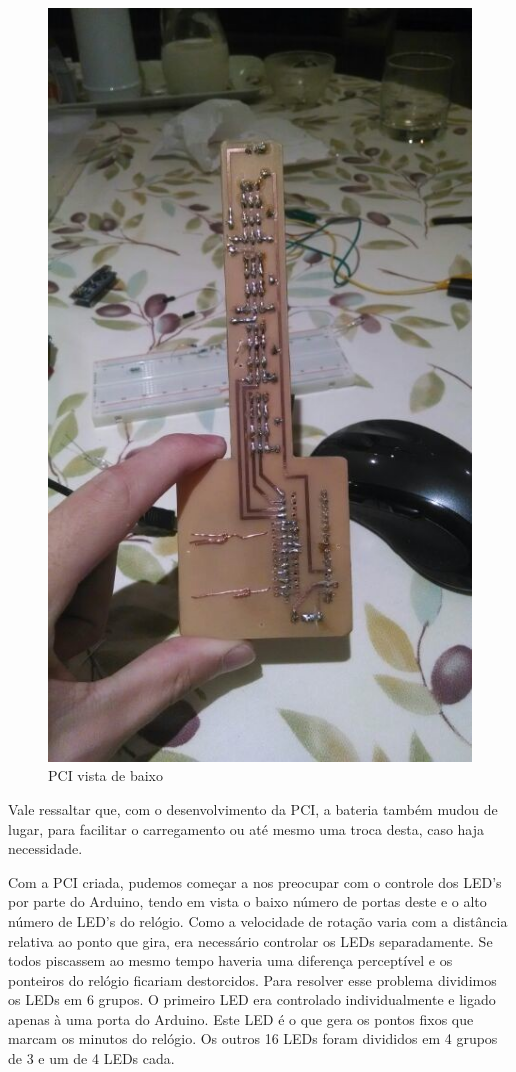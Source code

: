 \begin{figure}[!h]
	\centering
	\includegraphics{./PCI_baixo.jpg}
	\caption[PCI vista de baixo]{PCI vista de baixo}
	\label{fig:pci_baixo}
\end{figure}

Vale ressaltar que, com o desenvolvimento da PCI, a bateria também mudou de lugar, para facilitar o carregamento ou até mesmo uma troca desta, caso haja necessidade.

Com a PCI criada, pudemos começar a nos preocupar com o controle dos LED's por parte do Arduino, tendo em vista o baixo número de portas deste e o alto número de LED's do relógio.
Como a velocidade de rotação varia com a distância relativa ao ponto que gira, era necessário controlar os LEDs separadamente. Se todos piscassem ao mesmo tempo haveria uma diferença perceptível e os ponteiros do relógio ficariam destorcidos. Para resolver esse problema dividimos os LEDs em 6 grupos.
O primeiro LED era controlado individualmente e ligado apenas à uma porta do Arduino. Este LED é o que gera os pontos fixos que marcam os minutos do relógio.
Os outros 16 LEDs foram divididos em 4 grupos de 3 e um de 4 LEDs cada.

